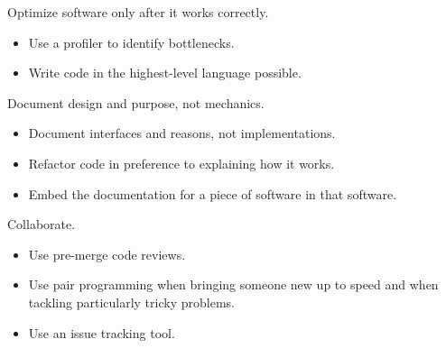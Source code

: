 \begin{frame}
\begin{cenumerate}
\item  Optimize software only after it works correctly. \vspace{0.3cm}
	\begin{itemize}
	\item  Use a profiler to identify bottlenecks.\vspace{0.2cm}
	\item  Write code in the highest-level language possible.
	\end{itemize}
\end{cenumerate}
\end{frame}

\begin{frame}
\begin{cenumerate}
\item  Document design and purpose, not mechanics. \vspace{0.3cm}
	\begin{itemize}
	\item  Document interfaces and reasons, not implementations.\vspace{0.2cm}
	\item  Refactor code in preference to explaining how it works.\vspace{0.2cm}
	\item  Embed the documentation for a piece of software in that software.
	\end{itemize}
\end{cenumerate}
\end{frame}

\begin{frame}
\begin{cenumerate}
\item  Collaborate. \vspace{0.3cm}
	\begin{itemize}
	\item  Use pre-merge code reviews.\vspace{0.2cm}
	\item  Use pair programming when bringing someone new up to speed and when tackling particularly tricky problems.\vspace{0.2cm}
	\item  Use an issue tracking tool.
	\end{itemize}
\end{cenumerate}
\end{frame}
